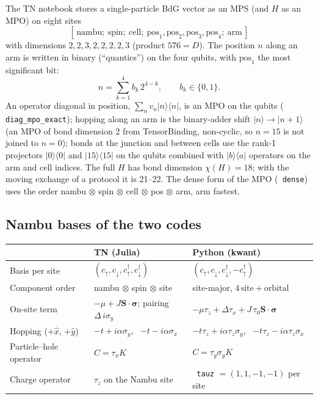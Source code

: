 \documentclass[11pt]{article}
\renewcommand{\code}[1]{\texttt{\hyphenchar\font=-1 #1}}
\newcommand{\ket}[1]{|#1\rangle}
\newcommand{\bra}[1]{\langle#1|}
\begin{document}
The TN notebook stores a single-particle BdG vector as an MPS (and $H$ as an MPO) on eight sites
\[
[\,\text{nambu};\ \text{spin};\ \text{cell};\ \text{pos}_1, \text{pos}_2, \text{pos}_3, \text{pos}_4;\ \text{arm}\,]
\]
with dimensions $2, 2, 3, 2,2,2,2, 3$ (product $576 = D$). The position $n$ along an arm is written in binary (``quantics'') on the
four qubits, with $\text{pos}_1$ the most significant bit:
\[
n = \sum_{k=1}^{4} b_k\, 2^{4-k}, \qquad b_k\in\{0,1\}.
\]
An operator diagonal in position, $\sum_n v_n \ket n\bra n$, is an MPO on the qubits (\code{diag\_mpo\_exact}); hopping along an arm is the
binary-adder shift $\ket n\to\ket{n+1}$ (an MPO of bond dimension 2 from TensorBinding, non-cyclic, so $n=15$ is not joined to
$n=0$); bonds at the junction and between cells use the rank-1 projectors $\ket0\bra0$ and $\ket{15}\bra{15}$ on the qubits combined with
$\ket{b}\bra{a}$ operators on the arm and cell indices. The full $H$ has bond dimension $\chi(H) = 18$; with the moving exchange of a
protocol it is 21--22. The dense form of the MPO (\code{dense}) uses the order nambu $\otimes$ spin $\otimes$ cell $\otimes$ pos $\otimes$ arm,
arm fastest.

\subsection{Nambu bases of the two codes}

\begin{center}
\begin{tabular}{lll}
\toprule
 & TN (Julia) & Python (kwant)\\
\midrule
Basis per site & $(c_\uparrow, c_\downarrow, c^\dagger_\uparrow, c^\dagger_\downarrow)$ & $(c_\uparrow, c_\downarrow, c^\dagger_\downarrow, -c^\dagger_\uparrow)$\\
Component order & nambu $\otimes$ spin $\otimes$ site & site-major, $4\,\text{site} + \text{orbital}$\\
On-site term & $-\mu + J\mathbf S\cdot\boldsymbol\sigma$; pairing $\Delta\,i\sigma_y$ & $-\mu\tau_z + \Delta\tau_x + J\,\tau_0\mathbf S\cdot\boldsymbol\sigma$\\
Hopping ($+\hat x$, $+\hat y$) & $-t + i\alpha\sigma_y$, \ $-t - i\alpha\sigma_x$ & $-t\tau_z + i\alpha\tau_z\sigma_y$, \ $-t\tau_z - i\alpha\tau_z\sigma_x$\\
Particle--hole operator & $C = \tau_x K$ & $C = \tau_y\sigma_y K$\\
Charge operator & $\tau_z$ on the Nambu site & \code{tauz} $= (1,1,-1,-1)$ per site\\
\bottomrule
\end{tabular}
\end{center}
\end{document}
